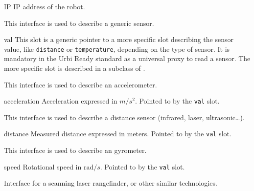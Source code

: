 \begin{urbiscriptapi}
\item[IP] IP address of the robot.
\end{urbiscriptapi}


This interface is used to describe a generic sensor.

\begin{urbiscriptapi}
\item[val] This slot is a generic pointer to a more specific slot describing
  the sensor value, like \lstinline{distance} or \lstinline{temperature},
  depending on the type of sensor. It is mandatory in the Urbi Ready
  standard as a universal proxy to read a sensor. The more specific slot is
  described in a subclass of .
\end{urbiscriptapi}


This interface is used to describe an accelerometer.

\begin{urbiscriptapi}
\item[acceleration] Acceleration expressed in $m/s^2$.  Pointed to by the
  \lstinline{val} slot.
\end{urbiscriptapi}


This interface is used to describe a distance sensor (infrared, laser,
ultrasonic\ldots).

\begin{urbiscriptapi}
\item[distance] Measured distance expressed in meters.  Pointed to by the
  \lstinline{val} slot.
\end{urbiscriptapi}


This interface is used to describe an gyrometer.

\begin{urbiscriptapi}
\item[speed] Rotational speed in $\mathrm{rad}/s$.  Pointed to by the
  \lstinline{val} slot.
\end{urbiscriptapi}


Interface for a scanning laser rangefinder, or other similar technologies.

